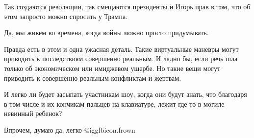 Так создаются революции, так смещаются президенты и Игорь прав в том, что об
этом запросто можно спросить у Трампа.

Да, мы живем во времена, когда войны можно просто придумывать.

Правда есть в этом и одна ужасная деталь. Такие виртуальные маневры могут
приводить к последствиям совершенно реальным. И ладно бы, если речь шла только
об экономическом или имиджевом ущербе. Но такие вещи могут приводить к
совершенно реальным конфликтам и жертвам.

И легко ли будет засыпать участникам шоу, когда они будут знать, что благодаря
в том числе и их кончикам пальцев на клавиатуре, лежит где-то в могиле невинный
ребенок?

Впрочем, думаю да, легко  @igg{fbicon.frown} 
